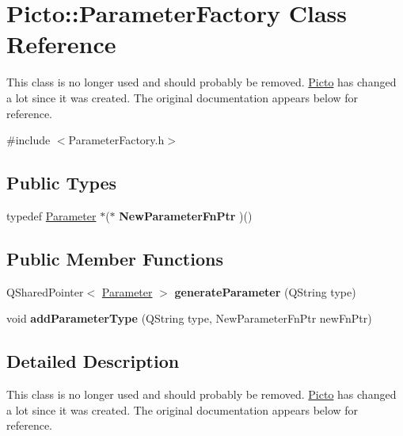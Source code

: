 \hypertarget{class_picto_1_1_parameter_factory}{\section{Picto\-:\-:Parameter\-Factory Class Reference}
\label{class_picto_1_1_parameter_factory}
}


This class is no longer used and should probably be removed. \hyperlink{namespace_picto}{Picto} has changed a lot since it was created. The original documentation appears below for reference.  




{\ttfamily \#include $<$Parameter\-Factory.\-h$>$}

\subsection*{Public Types}
\begin{DoxyCompactItemize}
\item 
\hypertarget{class_picto_1_1_parameter_factory_adf53ac1d95fdfed3da6e1104926914db}{typedef \hyperlink{class_picto_1_1_parameter}{Parameter} $\ast$($\ast$ {\bfseries New\-Parameter\-Fn\-Ptr} )()}\label{class_picto_1_1_parameter_factory_adf53ac1d95fdfed3da6e1104926914db}

\end{DoxyCompactItemize}
\subsection*{Public Member Functions}
\begin{DoxyCompactItemize}
\item 
\hypertarget{class_picto_1_1_parameter_factory_abe44c343b8a05974d068700b90fdd107}{Q\-Shared\-Pointer$<$ \hyperlink{class_picto_1_1_parameter}{Parameter} $>$ {\bfseries generate\-Parameter} (Q\-String type)}\label{class_picto_1_1_parameter_factory_abe44c343b8a05974d068700b90fdd107}

\item 
\hypertarget{class_picto_1_1_parameter_factory_ad56bfd48601aabb7a3616f1375eab3bd}{void {\bfseries add\-Parameter\-Type} (Q\-String type, New\-Parameter\-Fn\-Ptr new\-Fn\-Ptr)}\label{class_picto_1_1_parameter_factory_ad56bfd48601aabb7a3616f1375eab3bd}

\end{DoxyCompactItemize}


\subsection{Detailed Description}
This class is no longer used and should probably be removed. \hyperlink{namespace_picto}{Picto} has changed a lot since it was created. The original documentation appears below for reference. 

